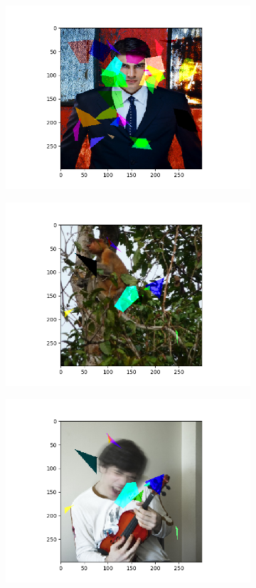 \documentclass[conference]{IEEEtran}
\begin{document}
\begin{figure}[htbp]
\begin{subfigure}{.3\textwidth}
  \includegraphics[width=1\linewidth]{fig/mortarboard.png}
\end{subfigure}
\begin{subfigure}[t]{.3\textwidth}
  \includegraphics[width=1\linewidth]{fig/proboscismonkey-pinwheel.png}
\end{subfigure}
\begin{subfigure}[t]{.3\textwidth}
  \includegraphics[width=1\linewidth]{fig/violin-pinwheel.png}

\end{subfigure}
\end{figure}
\end{document}
